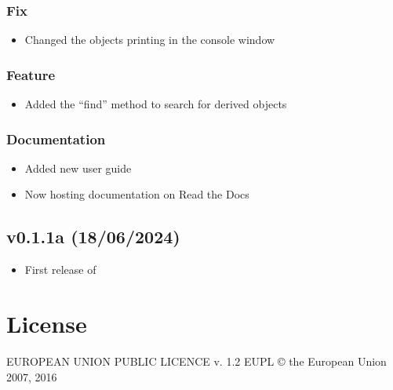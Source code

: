 \documentclass[letterpaper,10pt,english]{sphinxmanual}
\begin{document}
\subsubsection{Fix}
\label{\detokenize{changelog:fix}}\begin{itemize}
\item {} 
\sphinxAtStartPar
Changed the objects printing in the console window

\end{itemize}


\subsubsection{Feature}
\label{\detokenize{changelog:feature}}\begin{itemize}
\item {} 
\sphinxAtStartPar
Added the “find” method to search for derived objects

\end{itemize}


\subsubsection{Documentation}
\label{\detokenize{changelog:documentation}}\begin{itemize}
\item {} 
\sphinxAtStartPar
Added new user guide

\item {} 
\sphinxAtStartPar
Now hosting documentation on Read the Docs

\end{itemize}


\subsection{v0.1.1a (18/06/2024)}
\label{\detokenize{changelog:v0-1-1a-18-06-2024}}\begin{itemize}
\item {} 
\sphinxAtStartPar
First release of 

\end{itemize}

\sphinxstepscope


\section{License}
\label{\detokenize{license:license}}\label{\detokenize{license::doc}}
\begin{sphinxVerbatim}[commandchars=\\\{\}]
                 EUROPEAN UNION PUBLIC LICENCE v. 1.2
                  EUPL © the European Union 2007, 2016
\end{sphinxVerbatim}
\end{document}
